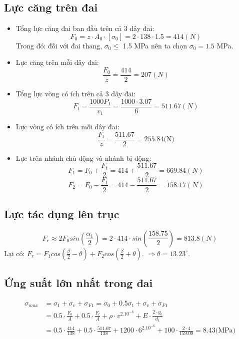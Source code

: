         \subsection{Lực căng trên đai}
            \begin{itemize}
                \item Tổng lực căng đai ban đầu trên cả 3 dây đai:
                $$F_{0} = z \cdot A_0 \cdot [\sigma_0] = 2 \cdot 138 \cdot 1.5 = 414 (N)$$
                Trong đó: đối với đai thang, $\sigma_0 \leq $ 1.5 MPa nên ta chọn $\sigma_0 = 1.5$ MPa.  
                \item Lực căng trên mỗi dây đai:
                $$\frac{F_0}{z} = \frac{414}{2} = 207 (N)$$
                \item Tổng lực vòng có ích trên cả 3 dây đai:
                $$F_t = \frac{1000P_I}{v_1} = \frac{1000 \cdot 3.07}{6} = 511.67 (N)$$
                \item Lực vòng có ích trên mỗi dây đai:
                $$\frac{F_t}{z} = \frac{511.67}{2} = 255.84 \text{(N)}$$
                \item Lực trên nhánh chủ động và nhánh bị động:
                $$F_{1} = F_0 + \frac{F_t}{2} = 414 + \frac{511.67}{2} = 669.84 (N)$$
                $$F_{2} = F_0 - \frac{F_t}{2} = 414 - \frac{511.67}{2} = 158.17 (N)$$
            \end{itemize}
        \subsection{Lực tác dụng lên trục}
            $$F_r \approx 2F_0sin(\frac{\alpha_1}{2}) = 2 \cdot 414 \cdot sin(\frac{158.75}{2}) = 813.8 (N)$$
            \hspace*{0.6cm}Lại có: $F_r = F_1cos(\frac{\beta}{2} - \theta) + F_2cos(\frac{\beta}{2} + \theta)$. $\Rightarrow \theta= 13.23^{\circ}$. 
        \subsection{Ứng suất lớn nhất trong đai}
            \begin{align*}
                \sigma_{max} &= \sigma_1 + \sigma_v + \sigma_{F1} = \sigma_0 + 0.5\sigma_t + \sigma_v + \sigma_{F1} \\
                &= 0.5 \cdot \frac{F_0}{A} + 0.5 \cdot \frac{F_t}{A} + \rho \cdot v^2.10^{-6} + E \cdot \frac{2 \cdot y_0}{d_1}\\
                &= 0.5 \cdot \frac{414}{138} + 0.5 \cdot \frac{511.67}{138} + 1200 \cdot 6^2.10^{-6} + 100 \cdot \frac{2 \cdot 4}{159.09} = 8.43 \text{(MPa)}
            \end{align*}
